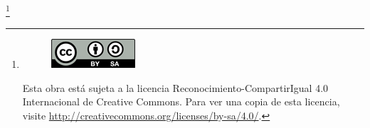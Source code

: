 \newpage
\let\thefootnote\relax\footnote{

 \begin{figure}[H]
 	\centering
    \includegraphics[scale=4]{img/by-sa_petit}
 \end{figure}

Esta obra está sujeta a la licencia Reconocimiento-CompartirIgual 4.0 Internacional de Creative Commons. Para ver una copia de esta licencia, visite \url{http://creativecommons.org/licenses/by-sa/4.0/}.
}
